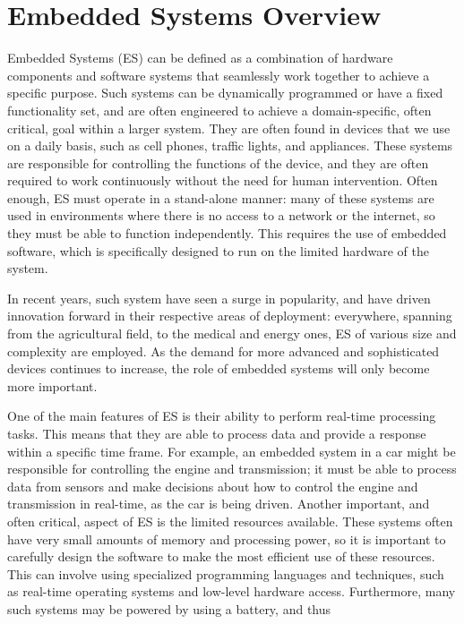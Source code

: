 \section{Embedded Systems Overview}
Embedded Systems (ES) can be defined as a combination of hardware components and software systems that seamlessly work together to achieve a specific purpose. Such systems can be dynamically programmed or have a fixed functionality set, and are often engineered to achieve a domain-specific, often critical, goal within a larger system. They are often found in devices that we use on a daily basis, such as cell phones, traffic lights, and appliances. These systems are responsible for controlling the functions of the device, and they are often required to work continuously without the need for human intervention.
Often enough, ES must operate in a stand-alone manner: many of these systems are used in environments where there is no access to a network or the internet, so they must be able to function independently. This requires the use of embedded software, which is specifically designed to run on the limited hardware of the system.

In recent years, such system have seen a surge in popularity, and have driven innovation forward in their respective areas of deployment: everywhere, spanning from the agricultural field, to the medical and energy ones, ES of various size and complexity are employed. As the demand for more advanced and sophisticated devices continues to increase, the role of embedded systems will only become more important.

One of the main features of ES is their ability to perform real-time processing tasks. This means that they are able to process data and provide a response within a specific time frame. For example, an embedded system in a car might be responsible for controlling the engine and transmission; it must be able to process data from sensors and make decisions about how to control the engine and transmission in real-time, as the car is being driven.
Another important, and often critical, aspect of ES is the limited resources available. These systems often have very small amounts of memory and processing power, so it is important to carefully design the software to make the most efficient use of these resources. This can involve using specialized programming languages and techniques, such as real-time operating systems and low-level hardware access. Furthermore, many such systems may be powered by using a battery, and thus

